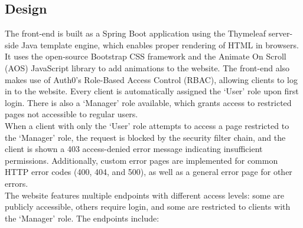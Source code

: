 \documentclass[10pt,a4paper,kul]{kulakarticle} %
\begin{document}
	\subsection{Design}
	The front-end is built as a Spring Boot application using the Thymeleaf server-side Java template engine, which enables proper rendering of HTML in browsers. It uses the open-source Bootstrap CSS framework and the Animate On Scroll (AOS) JavaScript library to add animations to the website. The front-end also makes use of Auth0's Role-Based Access Control (RBAC), allowing clients to log in to the website. Every client is automatically assigned the `User' role upon first login. There is also a `Manager' role available, which grants access to restricted pages not accessible to regular users.\\
	\newline
	When a client with only the `User' role attempts to access a page restricted to the `Manager' role, the request is blocked by the security filter chain, and the client is shown a 403 access-denied error message indicating insufficient permissions. Additionally, custom error pages are implemented for common HTTP error codes (400, 404, and 500), as well as a general error page for other errors. \\
	\newline
	The website features multiple endpoints with different access levels: some are publicly accessible, others require login, and some are restricted to clients with the `Manager' role. The endpoints include:
	
\end{document}
